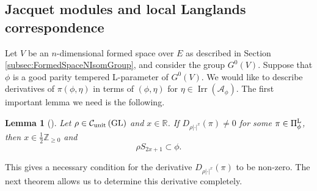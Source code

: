 \documentclass[11pt,letterpaper]{amsart}
\theoremstyle{plain}
\newcounter{theorem}[section]
\numberwithin{theorem}{section}
\numberwithin{equation}{subsection}
\newtheorem{Lem}[theorem]{Lemma}
\theoremstyle{remark}
\newcommand{\GL}{\operatorname{GL}}
\newcommand{\Irr}{\operatorname{Irr}}
\newcommand{\Z}{\mathbb{Z}}
\newcommand{\R}{\mathbb{R}}
\newcommand{\unit}{{\rm unit}}
\def\calA{\mathcal{A}}
\def\calC{\mathcal{C}}
\def\LP{\Pi^{\rm L}} %
\begin{document}
\subsection{Jacquet modules and local Langlands correspondence} %
\label{sub:jacquet_modules_and_local_langlands_correspondence}

Let $V$ be an $n$-dimensional formed space over $E$ as described in Section \ref{subsec:FormedSpaceNIsomGroup}, and consider the group $G^0(V)$. Suppose that $\phi$ is a good parity tempered L-parameter of $G^0(V)$. 
We would like to describe derivatives of $\pi\left(\phi,\eta\right)$ in terms of $\left(\phi,\eta\right)$ for $\eta\in\Irr\left(\calA_\phi\right)$. The first important lemma we need is the following.

\begin{Lem}[{\cite[Lem. 4.1]{MR4055180}}]\label{L:AtobeJacLLCLem.4.1}
Let $\rho\in\calC_{\unit}\left(\GL\right)$ and $x\in\R$. If $D_{\rho|\cdot|^x}\left(\pi\right)\neq 0$ for some $\pi\in\LP_\phi$, then $x\in\frac{1}{2}\Z_{\geq0}$ and
\[
    \rho S_{2x+1} \subset \phi.
\]
\end{Lem}

\vskip 5pt

This gives a necessary condition for the derivative $D_{\rho|\cdot|^x}\left(\pi\right)$ to be non-zero. The next theorem allows us to determine this derivative completely.
\end{document}
